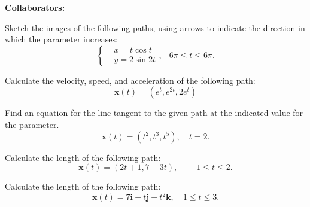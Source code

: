 \documentclass[11pt,letterpaper,boxed]{hmcpset}
\newcommand{\pn}[1]{\left( #1 \right)}
\begin{document}
\noindent\textbf{Collaborators:} 


\begin{problem}[Colley 3.1 \#3]
Sketch the images of the following paths, using arrows to indicate the direction in which the parameter increases:
\begin{equation*}
	\begin{cases}
		&x = t\cos t\\
		&y = 2\sin 2t
	\end{cases}
	,-6\pi \leq t \leq 6\pi.
\end{equation*}
\end{problem}

\begin{solution}
\vfill
\end{solution}
\newpage

\begin{problem}[Colley 3.1 \#10]
Calculate the velocity, speed, and acceleration of the following path:
\[
	\mathbf{x}(t) = \pn{e^t, e^{2t}, 2e^t}
\]
\end{problem}

\begin{solution}
\vfill
\end{solution}
\newpage

\begin{problem}[Colley 3.1 \#17]
Find an equation for the line tangent to the given path at the indicated value for the parameter.
\[
	\mathbf{x}(t) = (t^2,t^3,t^5), \quad t=2.
\]
\end{problem}

\begin{solution}
\vfill
\end{solution}
\newpage

\begin{problem}[Colley 3.2 \#1]
Calculate the length of the following path:
\[
	\mathbf{x}(t) = (2t+1,7-3t), \quad -1\leq t \leq 2.
\]
\end{problem}

\begin{solution}
\vfill
\end{solution}
\newpage

\begin{problem}[Colley 3.2 \#4]
Calculate the length of the following path:
\[
	\mathbf{x}(t) = 7\mathbf{i}+t\mathbf{j}+t^2\mathbf{k}, \quad 1 \leq t \leq 3.
\]
\end{problem}
\end{document}
